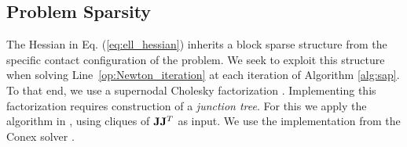 \subsection{Problem Sparsity}
\label{sec:problem_sparsity}

The Hessian in Eq. (\ref{eq:ell_hessian}) inherits a block sparse structure from
the specific contact configuration of the problem. We seek to exploit this
structure when solving Line~\ref{op:Newton_iteration} at each iteration of Algorithm \ref{alg:sap}.
To that end, we use a supernodal Cholesky factorization \cite[\S
9]{bib:davis2016survey}. Implementing this factorization requires construction
of a \emph{junction tree}.  For this we apply the algorithm in
\cite{bib:smail2017junction}, using cliques of ${\mathbf{J}}{\mathbf{J}}^T$ as input. We
use the implementation from the Conex solver \cite{bib:permenter2020}.

